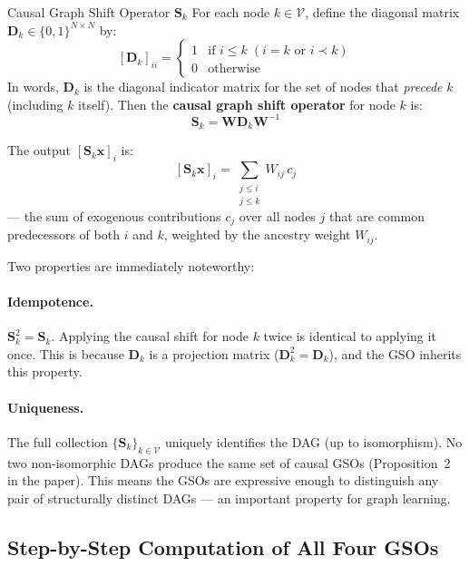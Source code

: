 \begin{mathbox}{Causal Graph Shift Operator $\mathbf{S}_k$}
For each node $k \in \mathcal{V}$, define the diagonal matrix
$\mathbf{D}_k \in \{0,1\}^{N \times N}$ by:
\[
    [\mathbf{D}_k]_{ii} = \begin{cases} 1 & \text{if } i \le k \; (i = k \text{ or } i \prec k) \\ 0 & \text{otherwise} \end{cases}
\]
In words, $\mathbf{D}_k$ is the diagonal indicator matrix for the set of nodes
that \emph{precede} $k$ (including $k$ itself). Then the \textbf{causal graph
shift operator} for node $k$ is:
\begin{equation}
    \mathbf{S}_k = \mathbf{W} \mathbf{D}_k \mathbf{W}^{-1}
    \label{eq:causal_gso}
\end{equation}

The output $[\mathbf{S}_k \mathbf{x}]_i$ is:
\[
    [\mathbf{S}_k \mathbf{x}]_i = \sum_{\substack{j \le i \\ j \le k}} W_{ij} \, c_j
\]
--- the sum of exogenous contributions $c_j$ over all nodes $j$ that are common
predecessors of both $i$ and $k$, weighted by the ancestry weight $W_{ij}$.
\end{mathbox}

Two properties are immediately noteworthy:

\paragraph{Idempotence.} $\mathbf{S}_k^2 = \mathbf{S}_k$. Applying the
causal shift for node $k$ twice is identical to applying it once. This is
because $\mathbf{D}_k$ is a projection matrix ($\mathbf{D}_k^2 = \mathbf{D}_k$),
and the GSO inherits this property.

\paragraph{Uniqueness.} The full collection $\{\mathbf{S}_k\}_{k \in \mathcal{V}}$
uniquely identifies the DAG (up to isomorphism). No two non-isomorphic DAGs
produce the same set of causal GSOs (Proposition~2 in the paper). This means
the GSOs are expressive enough to distinguish any pair of structurally distinct
DAGs --- an important property for graph learning.

\subsection{Step-by-Step Computation of All Four GSOs}


